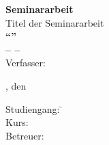\begin{titlepage}
\raggedleft

\centering
\vfill
{\bfseries\Huge Seminararbeit}\\
\vfill
Titel der Seminararbeit\\[2ex]
{\bfseries\Large "`\MyTitel{}"'}\\[1ex]
{\bfseries\small -- \MySemester{} --}\\
\vfill
Verfasser: \MyAuthor{}\\
\vfill
\raggedright
\small
\MyOrt, den \MyDatum\\[2cm]
\begin{tabbing}
Studiengang: \= \MyStudiengang{}\\
Kurs: \> \MyKurs{}\\
Betreuer:  \> \MyBetreuer{}\\
\end{tabbing}
\end{titlepage}